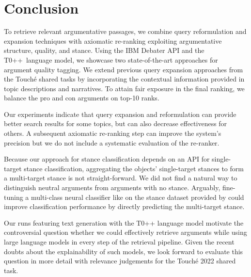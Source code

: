 \section{Conclusion}

To retrieve relevant argumentative passages, we combine query reformulation and expansion techniques with axiomatic re-ranking exploiting argumentative structure, quality, and stance.
Using the IBM Debater API and the T0++~language model, we showcase two state-of-the-art approaches for argument quality tagging.
We extend previous query expansion approaches from the Touché shared tasks by incorporating the contextual information provided in topic descriptions and narratives.
To attain fair exposure in the final ranking, we balance the pro and con arguments on top-10 ranks.

Our experiments indicate that query expansion and reformulation can provide better search results for some topics, but can also decrease effectiveness for others.
A subsequent axiomatic re-ranking step can improve the system's precision but we do not include a systematic evaluation of the re-ranker. 

Because our approach for stance classification depends on an API for single-target stance classification, aggregating the objects' single-target stances to form a multi-target stance is not straight-forward.
We did not find a natural way to distinguish neutral arguments from arguments with no stance.
Arguably, fine-tuning a multi-class neural classifier like \Bert on the stance dataset provided by \citeauthor{BondarenkoFKSGBPBSWPH2022} could improve classification performance by directly predicting the multi-target stance.

Our runs featuring text generation with the T0++ language model motivate the controversial question whether we could effectively retrieve arguments while using large language models in every step of the retrieval pipeline.
Given the recent doubts about the explainability of such models, we look forward to evaluate this question in more detail with relevance judgements for the Touché 2022 shared task.
